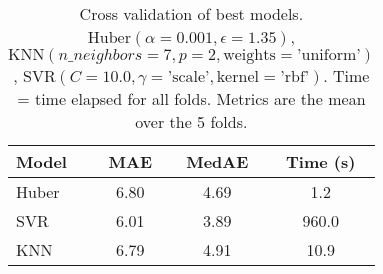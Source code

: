 \begin{table}
    \centering
    \caption{Cross validation of best models. $ \text{Huber}(\alpha=0.001, \epsilon=1.35)$,
     $ \text{KNN}(n\_neighbors=7, p=2, \text{weights}=\text{'uniform'})$, 
     $ \text{SVR}(C=10.0, \gamma=\text{'scale'}, \text{kernel}=\text{'rbf'})$. 
    Time = time elapsed for all folds. Metrics are the mean over the 5 folds.}
    \label{tab:year_song_cross_validation}
    \begin{tabular}{|l|c|c|c|}
    \toprule
    Model & MAE & MedAE  & Time (s) \\
    \midrule
    Huber & 6.80 & 4.69  & 1.2 \\ 
    SVR & 6.01 & 3.89  & 960.0 \\
    KNN & 6.79 & 4.91  & 10.9 \\
    \bottomrule
    \end{tabular}
\end{table}